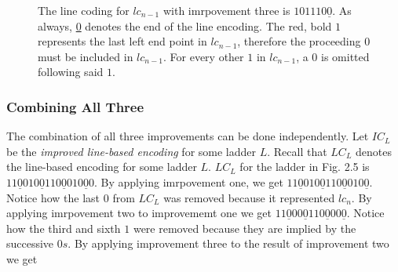 \begin{figure}[!htp]
    \centering
    \caption{The line coding for $lc_{n-1}$ with imrpovement three is $101110\underline{0}$.
    As always, \underline{0} denotes the end of the line encoding. The red, bold $1$ represents 
    the last left end point in $lc_{n-1}$, therefore the proceeding $0$ must be 
    included in $lc_{n-1}$. For every other $1$ in $lc_{n-1}$, a $0$ is omitted following 
    said $1$.}
\end{figure}
\subsubsection{Combining All Three}
The combination of all three improvements can be done independently. 
Let $IC_{L}$ be the \emph{improved line-based encoding} for some ladder $L$.
Recall that $LC_{L}$ denotes the line-based encoding for some ladder $L$.
$LC_{L}$ for the ladder in Fig. 2.5 is $11\underline{0}010\underline{0}110\underline{0}010\underline{0}0$.
By applying imrpovement one, we get $11\underline{0}010\underline{0}110\underline{0}010\underline{0}$. 
Notice how the last $0$ from $LC_{L}$ was removed because it represented $lc_{n}$.
By applying imrpovement two to improvememt one we get $11\underline{0}00\underline{0}110\underline{0}00\underline{0}$.
Notice how the third and sixth $1$ were removed because they are implied by 
the successive $0s$. By applying improvement three to the result of improvement 
two we get 
